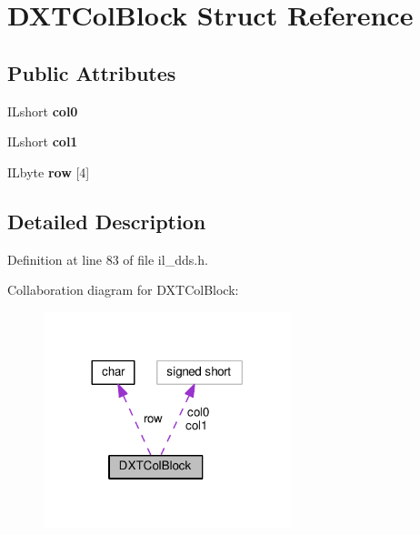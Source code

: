 \hypertarget{structDXTColBlock}{}\section{D\+X\+T\+Col\+Block Struct Reference}
\label{structDXTColBlock}
\subsection*{Public Attributes}
\begin{DoxyCompactItemize}
\item 
\mbox{\label{structDXTColBlock_a2d6b1a92c99e88be4f063e8425421430}} 
I\+Lshort {\bfseries col0}
\item 
\mbox{\label{structDXTColBlock_abdc9407f07f1f56a47d26ad3e6fc68ef}} 
I\+Lshort {\bfseries col1}
\item 
\mbox{\label{structDXTColBlock_acd271b69f417cbecfc4c5b2f93876a51}} 
I\+Lbyte {\bfseries row} \mbox{[}4\mbox{]}
\end{DoxyCompactItemize}


\subsection{Detailed Description}


Definition at line 83 of file il\+\_\+dds.\+h.



Collaboration diagram for D\+X\+T\+Col\+Block\+:
\nopagebreak
\begin{figure}[H]
\begin{center}
\leavevmode
\includegraphics[width=204pt]{d5/d83/structDXTColBlock__coll__graph}
\end{center}
\end{figure}


